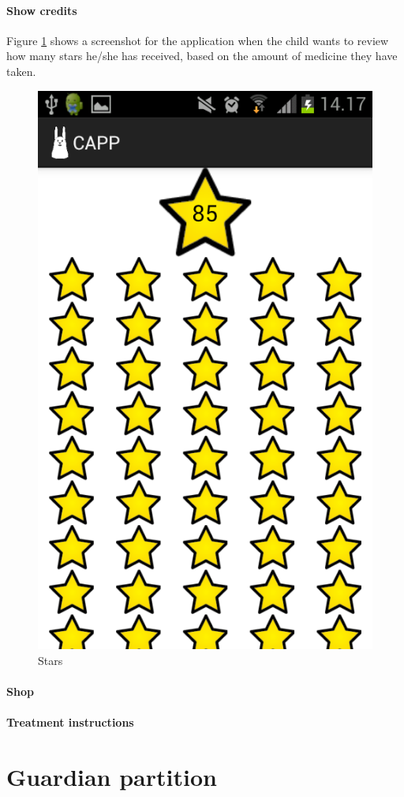 \paragraph{Show credits}

Figure \ref{fig:capp_stars} shows a screenshot for the application when the child wants to review how many stars he/she has received, based on the amount of medicine they have taken. 
\begin{figure}
		\centering
			\includegraphics[width=0.50\paperwidth]{Pictures/app-screenshots/capp_stars.png}
		\caption{Stars}
		\label{fig:capp_stars}
\end{figure}


\paragraph{Shop}

\paragraph{Treatment instructions}

\section{Guardian partition}



% 